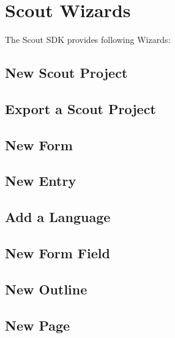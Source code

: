 \documentclass[a4paper,10pt,twoside]{book}
\begin{document}
\section{Scout Wizards}

The Scout SDK provides following Wizards:
\subsection{New Scout Project}

\subsection{Export a Scout Project}

\subsection{New Form}

\subsection{New Entry}

\subsection{Add a Language}

\subsection{New Form Field}

\subsection{New Outline}

\subsection{New Page}

\end{document}
